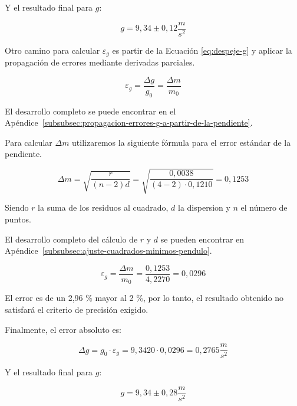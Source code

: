 Y el resultado final para $g$:

\begin{equation}
    \boxed{g = 9{,}34 \pm 0{,}12 \frac{m}{s^2}}
    \label{eq:g-final}
\end{equation}

Otro camino para calcular $\varepsilon_g$ es partir de la Ecuación \ref{eq:despeje-g} y aplicar la propagación de errores mediante derivadas parciales.

\begin{equation}
    \varepsilon_g = \frac{\Delta g}{g_0} = \frac{\Delta m}{m_0}
    \label{eq:incerteza-absoluta-g-pendiente}
\end{equation}

El desarrollo completo se puede encontrar en el Apéndice~\ref{subsubsec:propagacion-errores-g-a-partir-de-la-pendiente}.

Para calcular $\Delta m$ utilizaremos la siguiente fórmula para el error estándar de la pendiente.

\begin{equation}
    \Delta m = \sqrt{ \frac{r}{(n-2)d} } = \sqrt{ \frac{0{,}0038}{(4-2) \cdot 0{,}1210} } = 0{,}1253
    \label{eq:incerteza-absoluta-m}
\end{equation}

Siendo $r$ la suma de los residuos al cuadrado, $d$ la dispersion y $n$ el número de puntos.

El desarrollo completo del cálculo de $r$ y $d$ se pueden encontrar en Apéndice~\ref{subsubsec:ajuste-cuadrados-minimos-pendulo}.

\begin{equation}
    \varepsilon_g = \frac{\Delta m}{m_0} = \frac{0{,}1253}{4{,}2270} = 0{,}0296
    \label{eq:error-relativo-g-pendiente}
\end{equation}

El error es de un 2,96 \% mayor al 2 \%, por lo tanto, el resultado obtenido no satisfará el criterio de precisión exigido.

Finalmente, el error absoluto es:

\begin{equation}
    \Delta g = g_0 \cdot \varepsilon_g = 9{,}3420 \cdot 0{,}0296 = 0{,}2765 \frac{m}{s^2}
    \label{eq:incerteza-absoluta-g-pendiente-resultado}
\end{equation}

Y el resultado final para $g$:

\begin{equation}
    \boxed{g = 9{,}34 \pm 0{,}28 \frac{m}{s^2}}
    \label{eq:g-final-pendiente}
\end{equation}

